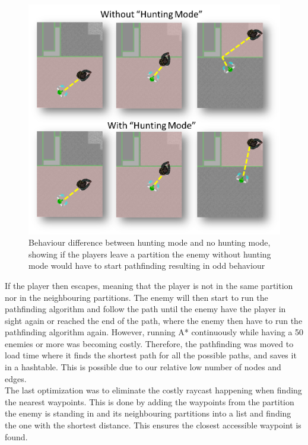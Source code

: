 \begin{figure}[H]
        \includegraphics[width=\textwidth]{figures/astar/huntingMode.png}
    \caption{Behaviour difference between hunting mode and no hunting mode, showing if the players leave a partition the enemy without hunting mode would have to start pathfinding resulting in odd behaviour}\label{huntingMode}
\end{figure}

If the player then escapes, meaning that the player is not in the same partition nor in the neighbouring partitions. 
The enemy will then start to run the pathfinding algorithm and follow the path until the enemy have the player in sight again or reached the end of the path, where the enemy then have to run the pathfinding algorithm again.	
However, running A* continuously while having a 50 enemies or more was becoming costly.
Therefore, the pathfinding was moved to load time where it finds the shortest path for all the possible paths, and saves it in a hashtable.
This is possible due to our relative low number of nodes and edges.\\
The last optimization was to eliminate the costly raycast happening when finding the nearest waypoints. 
This is done by adding the waypoints from the partition the enemy is standing in and its neighbouring partitions into a list and finding the one with the shortest distance. 
This ensures the closest accessible waypoint is found.

